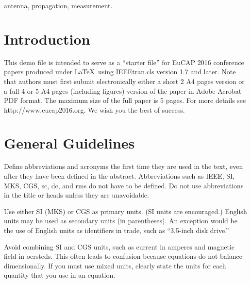 \documentclass[conference,a4paper]{IEEEtran}
\begin{document}
{\smallskip \keywords antenna, propagation, measurement.}



%
\IEEEpeerreviewmaketitle

\vspace{7pt}
\section{Introduction}
This demo file is intended to serve as a ``starter file''
for EuCAP 2016 conference papers produced under \LaTeX\ using
IEEEtran.cls version 1.7 and later.
Note that authors must first submit electronically either a short 2 A4 pages version or a full 4 or 5 A4 pages (including figures) version of the paper in Adobe Acrobat PDF format. The maximum size of the full paper is 5 pages. For more details see http://www.eucap2016.org. We wish you the best of success.

\vspace{7pt}
\section{General Guidelines}
Define abbreviations and acronyms the first time they are used in the text, even after they have been defined in the abstract. Abbreviations such as IEEE, SI, MKS, CGS, sc, dc, and rms do not have to be defined. Do not use abbreviations in the title or heads unless they are unavoidable.

Use either SI (MKS) or CGS as primary units. (SI units are encouraged.) English units may be used as secondary units (in parentheses). An exception would be the use of English units as identifiers in trade, such as “3.5-inch disk drive.”

Avoid combining SI and CGS units, such as current in amperes and magnetic field in oersteds. This often leads to confusion because equations do not balance dimensionally. If you must use mixed units, clearly state the units for each quantity that you use in an equation.
\end{document}
